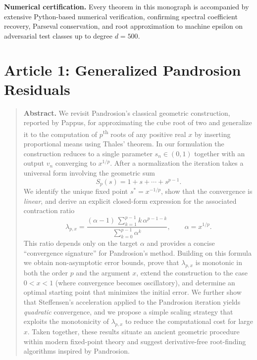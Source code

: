 \documentclass[10pt,a4paper,oneside]{book}
\theoremstyle{definition}
\theoremstyle{remark}
\newenvironment{abstract}{\begin{quote}\small\textbf{Abstract.}}{\end{quote}}
\begin{document}
\medskip

\textbf{Numerical certification.}\quad
Every theorem in this monograph is accompanied by extensive Python-based numerical verification, confirming spectral coefficient recovery, Parseval conservation, and root approximation to machine epsilon on adversarial test classes up to degree $d=500$.

\chapter{Article 1: Generalized Pandrosion Residuals}
\graphicspath{{../}{../../figures/}{../smale/figures/}}


\begin{abstract}
We revisit Pandrosion's classical geometric construction, reported by Pappus, for approximating the cube root of two and generalize it to the computation of $p$\textsuperscript{th} roots of any positive real $x$ by inserting proportional means using Thales' theorem.  In our formulation the construction reduces to a single parameter $s_n \in(0,1)$ together with an output $v_n$ converging to $x^{1/p}$.  After a normalization the iteration takes a universal form involving the geometric sum
\[
  S_p(s)=1+s+\cdots+s^{p-1}.
\]
We identify the unique fixed point $s^* = x^{-1/p}$, show that the convergence is \emph{linear}, and derive an explicit closed-form expression for the associated contraction ratio
\[
  \lambda_{p,x} = \frac{(\alpha - 1)\,\sum_{k=1}^{p-1} k\,\alpha^{p-1-k}}{\sum_{k=0}^{p-1} \alpha^k},
  \qquad \alpha = x^{1/p}.
\]
This ratio depends only on the target $\alpha$ and provides a concise ``convergence signature'' for Pandrosion's method.  Building on this formula we obtain non-asymptotic error bounds, prove that $\lambda_{p,x}$ is monotonic in both the order $p$ and the argument $x$, extend the construction to the case $0<x<1$ (where convergence becomes oscillatory), and determine an optimal starting point that minimizes the initial error.  We further show that Steffensen's acceleration applied to the Pandrosion iteration yields \emph{quadratic} convergence, and we propose a simple scaling strategy that exploits the monotonicity of $\lambda_{p,x}$ to reduce the computational cost for large $x$.  Taken together, these results situate an ancient geometric procedure within modern fixed-point theory and suggest derivative-free root-finding algorithms inspired by Pandrosion.
\end{abstract}
\end{document}
